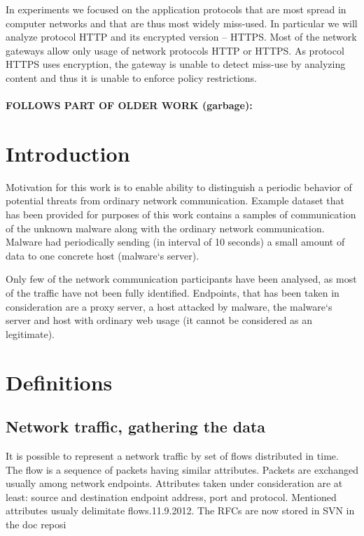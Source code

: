 \cite{rossum2011python,oliphant2006numpy,pedregosa2011scikit}

In experiments we focused on the application protocols that are most 
spread in computer networks and that are thus most widely miss-used. 
In particular we will analyze protocol HTTP and its encrypted version -- HTTPS. 
Most of the network gateways allow only usage of network protocols HTTP or HTTPS. 
As protocol HTTPS uses encryption, the gateway is unable to detect miss-use by 
analyzing content and thus it is unable to enforce policy restrictions.
~\\
~\\
\textbf{FOLLOWS PART OF OLDER WORK (garbage):}

\section{Introduction}
Motivation for this work is to enable ability to distinguish a periodic behavior of potential threats from ordinary network communication. Example dataset that has been provided for purposes of this work contains a samples of communication of the unknown malware along with the ordinary network communication. Malware had periodically sending  (in interval of 10 seconds) a small amount of data to one concrete host (malware`s server).

Only few of the network communication participants have been analysed, as most of the traffic have not been fully identified. Endpoints, that has been taken in consideration are a proxy server, a host attacked by malware, the malware`s server and host with ordinary web usage (it cannot be considered as an legitimate).

\section{Definitions}
\subsection{Network traffic, gathering the data}
It is possible to represent a network traffic by set of flows distributed in time. The flow is a sequence of packets having  similar attributes. Packets are exchanged usually among network endpoints. Attributes taken under consideration are at least: source and destination endpoint address, port and protocol. Mentioned attributes usualy delimitate flows.11.9.2012. The RFCs are now stored in SVN in the doc reposi

